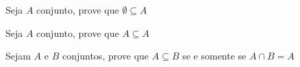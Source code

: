 \begin{exercise}
%
Seja $A$ conjunto, prove que $\emptyset \subseteq A$
\end{exercise}

\begin{exercise}
%
Seja $A$ conjunto, prove que $A \subseteq A$
\end{exercise}

\begin{exercise}
%
Sejam $A$ e $B$ conjuntos, prove que $A \subseteq B$ se e somente se $A \cap B = A$
\end{exercise}

